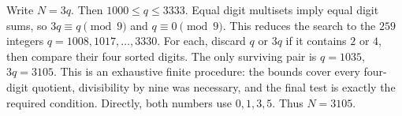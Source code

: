 Write $N=3q$. Then $1000\le q\le3333$. Equal digit multisets imply equal digit sums, so $3q\equiv q\pmod9$ and $q\equiv0\pmod9$. This reduces the search to the $259$ integers $q=1008,1017,\ldots,3330$. For each, discard $q$ or $3q$ if it contains $2$ or $4$, then compare their four sorted digits. The only surviving pair is $q=1035$, $3q=3105$. This is an exhaustive finite procedure: the bounds cover every four-digit quotient, divisibility by nine was necessary, and the final test is exactly the required condition. Directly, both numbers use $0,1,3,5$. Thus $\boxed{N=3105}$.
